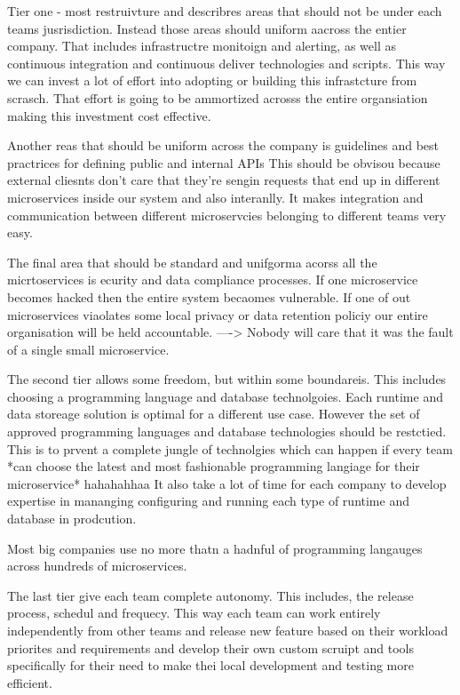 \documentclass[a4paper, 11pt]{book}
\begin{document}
{    Tier one - most restruivture and describres areas that should not be under each teams jusrisdiction.
    Instead those areas should uniform aacross the entier company.
    That includes infrastructre monitoign and alerting, as well as continuous integration and continuous deliver technologies and scripts.
    This way we can invest a lot of effort into adopting or building this infrastcture from scrasch.
    That effort is going to be ammortized acrosss the entire organsiation making this investment cost effective.

    Another reas that should be uniform across the company is guidelines and best practrices for defining public and internal APIs
    This should be obvisou because external cliesnts don't care that they're sengin requests that end up in different microservices inside our system and also interanlly.
    It makes integration and communication between different microservcies belonging to different teams very easy.

    The final area that should be standard and unifgorma acorss all the micrtoservices is ecurity and data compliance processes.
    If one microservice becomes hacked then the entire system becaomes vulnerable. If one of out microservices viaolates some local privacy or data retention policiy our entire organisation will be held accountable.
    ----> Nobody will care that it was the fault of a single small microservice.

    The second tier allows some freedom, but within some boundareis.
    This includes choosing a programming language and database technolgoies.
    Each runtime and data storeage solution is optimal for a different use case.
    However the set of approved programming languages and database technologies should be restctied.
    This is to prvent a complete jungle of technolgies which can happen if every team *can choose the latest and most fashionable programming langiage for their microservice* hahahahhaa
    It also take a lot of time for each company to develop expertise in mananging configuring and running each type of runtime and database in prodcution.

    Most big companies use no more thatn a hadnful of programming langauges across hundreds of microservices.

    The last tier give each team complete autonomy.
    This includes, the release process, schedul and frequecy.
    This way each team can work entirely independently from other teams and release new feature based on their workload priorites and requirements and develop their own custom scruipt and tools specifically for their need to make thei local development and testing more efficient.

}
\end{document}
